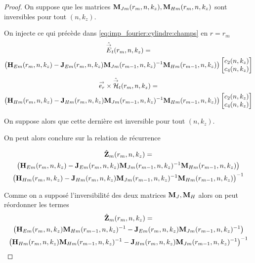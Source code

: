 \begin{proof}
      On suppose que les matrices \(\mathbf{M}_{Jm}(r_m,n,k_z), \mathbf{M}_{Hm}(r_m,n,k_z)\) sont inversibles pour tout \((n,k_z)\).

      On injecte ce qui précède dans \eqref{eq:imp_fourier:cylindre:champs} en \(r = r_{m}\)
      \begin{multline}
        \hat{{\overset{\rightarrow}{E}}}_t(r_m,n,k_z) = \\
        \left(\mathbf{H}_{Em}(r_{m},n,k_z) - \mathbf{J}_{Em}(r_{m},n,k_z)\mathbf{M}_{Jm}(r_{m-1},n,k_z)^{-1}\mathbf{M}_{Hm}(r_{m-1},n,k_z)\right)
        \begin{bmatrix}
          c_2(n,k_z) \\
          c_4(n,k_z)
        \end{bmatrix}
      \end{multline}        
      \begin{multline}
        {\overset{\rightarrow}{e_r}}\times\hat{{\overset{\rightarrow}{\mathcal{H}}}}_t(r_m,n,k_z) = \\
        \left(\mathbf{H}_{Hm}(r_{m},n,k_z) - \mathbf{J}_{Hm}(r_{m},n,k_z)\mathbf{M}_{Jm}(r_{m-1},n,k_z)^{-1}\mathbf{M}_{Hm}(r_{m-1},n,k_z) \right)
        \begin{bmatrix}
          c_2(n,k_z) \\
          c_4(n,k_z)
        \end{bmatrix}
      \end{multline}

      On suppose alors que cette dernière est inversible pour tout \((n,k_z)\).

      On peut alors conclure sur la relation de récurrence

      \begin{multline}
        \hat{\mathbf{Z}}_{m}(r_m,n,k_z) =\\
          \left(\mathbf{H}_{Em}(r_m,n,k_z) - \mathbf{J}_{Em}(r_m,n,k_z)\mathbf{M}_{Jm}(r_{m-1},n,k_z)^{-1}\mathbf{M}_{Hm}(r_{m-1},n,k_z)\right) \\
          \left(\mathbf{H}_{Hm}(r_m,n,k_z) - \mathbf{J}_{Hm}(r_m,n,k_z)\mathbf{M}_{Jm}(r_{m-1},n,k_z)^{-1}\mathbf{M}_{Hm}(r_{m-1},n,k_z)\right)^{-1}
      \end{multline}

      Comme on a supposé l'inversibilité des deux matrices \(\mathbf{M}_J, \mathbf{M}_H\) alors on peut réordonner les termes
      \begin{multline}
        \hat{\mathbf{Z}}_{m}(r_m,n,k_z) =\\
          \left(\mathbf{H}_{Em}(r_m,n,k_z)\mathbf{M}_{Hm}(r_{m-1},n,k_z)^{-1} - \mathbf{J}_{Em}(r_m,n,k_z)\mathbf{M}_{Jm}(r_{m-1},n,k_z)^{-1}\right) \\
          \left(\mathbf{H}_{Hm}(r_m,n,k_z)\mathbf{M}_{Hm}(r_{m-1},n,k_z)^{-1} - \mathbf{J}_{Hm}(r_m,n,k_z)\mathbf{M}_{Jm}(r_{m-1},n,k_z)^{-1}\right)^{-1}
      \end{multline}

    \end{proof}

